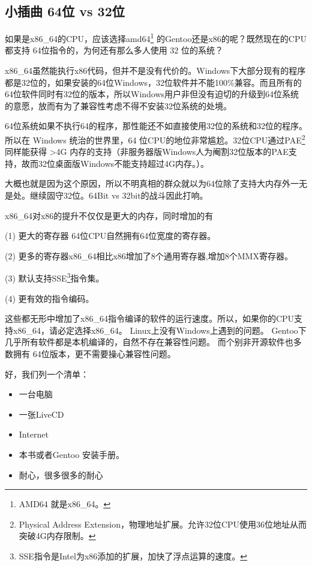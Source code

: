 \documentclass[amstex,twoside]{ctexbook}
\newenvironment{insertnote}{ \ttfamily\CJKfamily{KaiTi} }{\vskip 0.5cm }
\begin{document}
\begin{insertnote}
\subsection*{小插曲  64位 vs 32位}

如果是x86\_64的CPU，应该选择amd64\footnote{AMD64 就是x86\_64。}
的Gentoo还是x86的呢？既然现在的CPU都支持 64位指令的，为何还有那么多人使用 32 位的系统？

x86\_64虽然能执行x86代码，但并不是没有代价的。Windows下大部分现有的程序都是32位的，如果安装的64位Windows，32位软件并不能100\%兼容。而且所有的64位软件同时有32位的版本，所以Windows用户非但没有迫切的升级到64位系统的意愿，放而有为了兼容性考虑不得不安装32位系统的处境。

64位系统如果不执行64的程序，那性能还不如直接使用32位的系统和32位的程序。所以在 Windows 统治的世界里，64 位CPU的地位非常尴尬。32位CPU通过PAE\footnote{Physical Address Extension，物理地址扩展。允许32位CPU使用36位地址从而突破4G内存限制。}同样能获得 >4G 内存的支持（非服务器版Windows人为阉割32位版本的PAE支持，故而32位桌面版Windows不能支持超过4G内存。）。

大概也就是因为这个原因，所以不明真相的群众就以为64位除了支持大内存外一无是处。继续固守32位。64Bit vs 32bit的战斗因此打响。

x86\_64对x86的提升不仅仅是更大的内存，同时增加的有

(1)  更大的寄存器 64位CPU自然拥有64位宽度的寄存器。

(2)  更多的寄存器x86\_64相比x86增加了8个通用寄存器,增加8个MMX寄存器。

(3)  默认支持SSE\footnote{SSE指令是Intel为x86添加的扩展，加快了浮点运算的速度。}指令集。

(4)  更有效的指令编码。

这些都无形中增加了x86\_64指令编译的软件的运行速度。所以，如果你的CPU支持x86\_64，请必定选择x86\_64。
Linux上没有Windows上遇到的问题。
Gentoo下几乎所有软件都是本机编译的，自然不存在兼容性问题。
而个别非开源软件也多数拥有 64位版本，更不需要操心兼容性问题。
\end{insertnote}

好，我们列一个清单：


\begin{itemize}
\item[ \checked] 一台电脑
\item[ \checked] 一张LiveCD
\item[ \checked] Internet
\item[ \checked] 本书或者Gentoo 安装手册。
\item[ \checked] 耐心，很多很多的耐心
\end{itemize}
\end{document}
